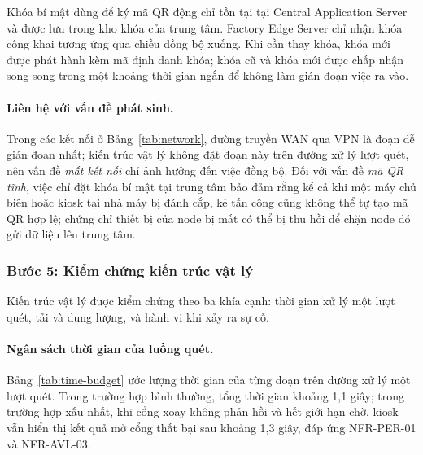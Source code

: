 Khóa bí mật dùng để ký mã QR động chỉ tồn tại tại Central Application Server và được lưu trong kho khóa của trung tâm. Factory Edge Server chỉ nhận khóa công khai tương ứng qua chiều đồng bộ xuống. Khi cần thay khóa, khóa mới được phát hành kèm mã định danh khóa; khóa cũ và khóa mới được chấp nhận song song trong một khoảng thời gian ngắn để không làm gián đoạn việc ra vào.

\paragraph{Liên hệ với vấn đề phát sinh.} Trong các kết nối ở Bảng~\ref{tab:network}, đường truyền WAN qua VPN là đoạn dễ gián đoạn nhất; kiến trúc vật lý không đặt đoạn này trên đường xử lý lượt quét, nên vấn đề \textit{mất kết nối} chỉ ảnh hưởng đến việc đồng bộ. Đối với vấn đề \textit{mã QR tĩnh}, việc chỉ đặt khóa bí mật tại trung tâm bảo đảm rằng kể cả khi một máy chủ biên hoặc kiosk tại nhà máy bị đánh cắp, kẻ tấn công cũng không thể tự tạo mã QR hợp lệ; chứng chỉ thiết bị của node bị mất có thể bị thu hồi để chặn node đó gửi dữ liệu lên trung tâm.

\subsubsection{Bước 5: Kiểm chứng kiến trúc vật lý}\label{sec:physical-step5}
Kiến trúc vật lý được kiểm chứng theo ba khía cạnh: thời gian xử lý một lượt quét, tải và dung lượng, và hành vi khi xảy ra sự cố.

\paragraph{Ngân sách thời gian của luồng quét.} Bảng~\ref{tab:time-budget} ước lượng thời gian của từng đoạn trên đường xử lý một lượt quét. Trong trường hợp bình thường, tổng thời gian khoảng 1,1 giây; trong trường hợp xấu nhất, khi cổng xoay không phản hồi và hết giới hạn chờ, kiosk vẫn hiển thị kết quả mở cổng thất bại sau khoảng 1,3 giây, đáp ứng NFR-PER-01 và NFR-AVL-03.

